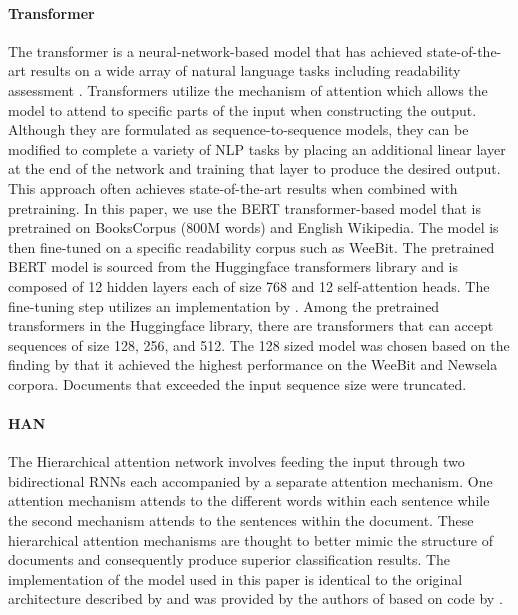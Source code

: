 \documentclass[11pt,a4paper]{article}
\theoremstyle{definition}
\begin{document}
\paragraph{Transformer}
\label{sec:methodTransformer}
The transformer \citep{vaswaniAttentionAllYou2017} is a neural-network-based model that has achieved state-of-the-art results on a wide array of natural language tasks including readability assessment \citep{martincSupervisedUnsupervisedNeural2019}. Transformers utilize the mechanism of attention which allows the model to attend to specific parts of the input when constructing the output. Although they are formulated as sequence-to-sequence models, they can be modified to complete a variety of NLP tasks by placing an additional linear layer at the end of the network and training that layer to produce the desired output. This approach often achieves state-of-the-art results when combined with pretraining. In this paper, we use the BERT \citep{devlinBERTPretrainingDeep2019} transformer-based model that is pretrained on BooksCorpus (800M words) \citep{zhuAligningBooksMovies2015} and English Wikipedia. The model is then fine-tuned on a specific readability corpus such as WeeBit. The pretrained BERT model is sourced from the Huggingface transformers library \citep{Wolf2019HuggingFacesTS} and is composed of 12 hidden layers each of size 768 and 12 self-attention heads. The fine-tuning step utilizes an implementation by \citet{martincSupervisedUnsupervisedNeural2019}. Among the pretrained transformers in the Huggingface library, there are transformers that can accept sequences of size 128, 256, and 512. The 128 sized model was chosen based on the finding by \citet{martincSupervisedUnsupervisedNeural2019} that it achieved the highest performance on the WeeBit and Newsela corpora. Documents that exceeded the input sequence size were truncated.

\paragraph{HAN}
The Hierarchical attention network involves feeding the input through two bidirectional RNNs each accompanied by a separate attention mechanism. One attention mechanism attends to the different words within each sentence while the second mechanism attends to the sentences within the document. These hierarchical attention mechanisms are thought to better mimic the structure of documents and consequently produce superior classification results. The implementation of the model used in this paper is identical to the original architecture described by \citet{yangHierarchicalAttentionNetworks2016} and was provided by the authors of \citet{martincSupervisedUnsupervisedNeural2019} based on code by \citet{nguyenHierarchicalAttentionNetworks2020}.
\label{sec:methodHan}
\end{document}
